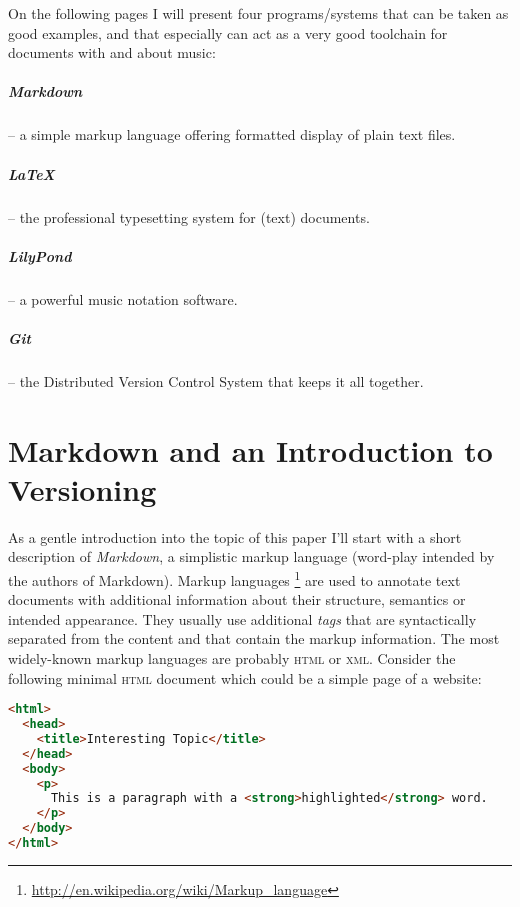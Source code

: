 \documentclass[../../LilyPond-Tutorials]{subfiles}
\begin{document}
\bigskip

On the following pages I will present four programs/systems that can be taken as good examples, and that especially can act as a very good toolchain for  documents with and about music:

\paragraph{Markdown} -- a simple markup language offering formatted display of plain text files.

\paragraph{\LaTeX} --
the professional typesetting system for (text) documents.

\paragraph{LilyPond} --
a powerful music notation software.

\paragraph{Git} --
the Distributed Version Control System that keeps it all together.


\chapter{Markdown and an Introduction to Versioning}
As a gentle introduction into the topic of this paper I'll start with a short description of \emph{Markdown}, a simplistic markup language (word-play intended by the authors of Markdown).
Markup languages%
\footnote{\url{http://en.wikipedia.org/wiki/Markup_language}}
are used to annotate text documents with additional information about their structure, semantics or intended appearance.
They usually use additional \emph{tags} that are syntactically separated from the content and that contain the markup information.
The most widely-known markup languages are probably \textsc{html} or \textsc{xml}.
Consider the following minimal \textsc{html} document which could be a simple page of a website:

\begin{lstlisting}[language=HTML]
<html>
  <head>
    <title>Interesting Topic</title>
  </head>
  <body>
    <p>
      This is a paragraph with a <strong>highlighted</strong> word.
    </p>
  </body>
</html>
\end{lstlisting}
\end{document}
